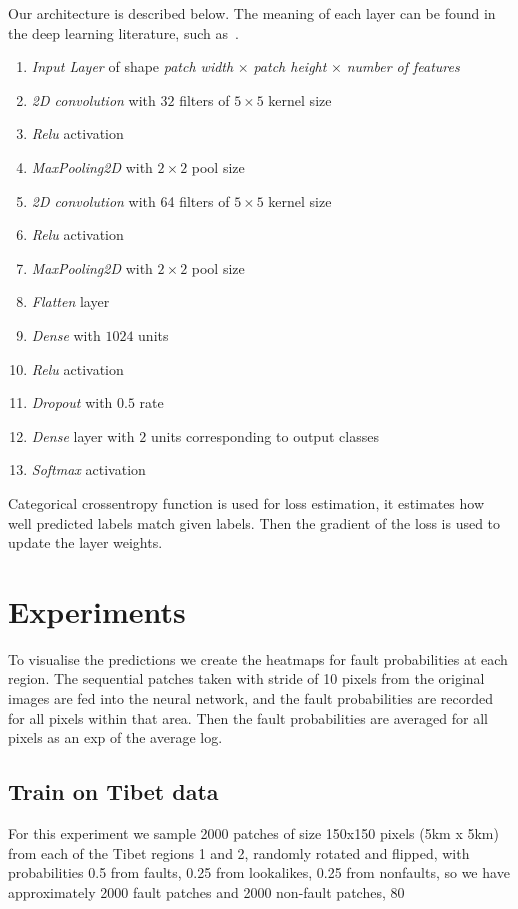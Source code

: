 \documentclass[11pt,a4paper]{article}
\begin{document}
Our architecture is described below. The meaning of each layer can be found in the deep learning literature, such
as~\cite{cnn-tutorial}.

\begin{enumerate}
\item \textit{Input Layer} of shape \textit{patch width} $\times$ \textit{patch height} $\times$ \textit{number of features}
\item \textit{2D convolution} with $32$ filters of $5 \times 5$ kernel size
\item \textit{Relu} activation
\item \textit{MaxPooling2D} with $2 \times 2$ pool size
\item \textit{2D convolution} with 64 filters of $5 \times 5$ kernel size
\item \textit{Relu} activation
\item \textit{MaxPooling2D} with $2 \times 2$ pool size
\item \textit{Flatten} layer
\item \textit{Dense} with $1024$ units
\item \textit{Relu} activation
\item \textit{Dropout} with $0.5$ rate
\item \textit{Dense} layer with $2$ units corresponding to output classes
\item \textit{Softmax} activation
\end{enumerate}
Categorical crossentropy function is used for loss estimation, it estimates how well predicted labels match given labels.
Then the gradient of the loss is used to update the layer weights.


\section{Experiments}
To visualise the predictions we create the heatmaps for fault probabilities at each region. The sequential patches
taken with stride of 10 pixels from the original images are fed into the neural network, and the fault probabilities are
recorded for all pixels within that area. Then the fault probabilities are averaged for all pixels as an exp of the
average log.


\subsection{Train on Tibet data}
For this experiment we sample 2000 patches of size 150x150 pixels (5km x 5km) from each of the Tibet regions 1 and 2,
randomly rotated and flipped, with probabilities 0.5 from faults, 0.25 from lookalikes, 0.25 from nonfaults, so we have
approximately 2000 fault patches and 2000 non-fault patches, 80%
\end{document}
